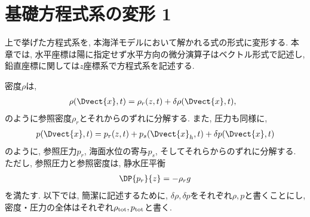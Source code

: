 \section{基礎方程式系の変形 1}
上で挙げた方程式系を, 本海洋モデルにおいて解かれる式の形式に変形する.
本章では, 水平座標は陽に指定せず水平方向の微分演算子はベクトル形式で記述し, 
鉛直座標に関しては$z$座標系で方程式系を記述する.   


密度$\rho$は,
\begin{align}
 \rho(\Dvect{x},t) = \rho_r(z,t)    +  \delta \rho(\Dvect{x},t), \;\;
\end{align}
のように参照密度$\rho_r$とそれからのずれに分解する.
また, 圧力も同様に,  
\begin{align}
 p(\Dvect{x},t)    = p_r(z,t) + p_s(\Dvect{x}_h,t)  + \delta p(\Dvect{x},t)  
\end{align}
のように, 参照圧力$p_r$, 海面水位の寄与$p_s$, そしてそれらからのずれに分解する. 
ただし, 参照圧力と参照密度は, 静水圧平衡
\begin{align}
  \DP{p_r}{z} = - \rho_r g
\end{align}
を満たす. 
以下では, 簡潔に記述するために, 
$\delta \rho, \delta p$をそれぞれ$\rho, p$と書くことにし,  
密度・圧力の全体はそれぞれ$\rho_{\rm tot}, p_{\rm tot}$と書く. 

